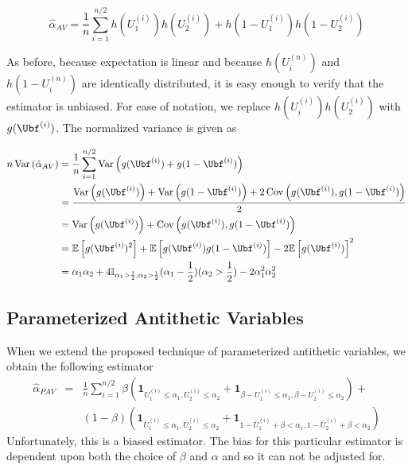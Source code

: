 \documentclass[10pt]{article}
\DeclareMathOperator{\var}{Var}
\DeclareMathOperator{\cov}{Cov}
\begin{document}
\begin{equation}
\hat{\alpha}_{AV} = \frac{1}{n}\displaystyle\sum_{i=1}^{n/2}h(U_{1}^{(i)})h(U_{2}^{(i)})+h(1 - U_{1}^{(i)})h(1 - U_{2}^{(i)})
\end{equation}

As before, because expectation is linear and because $h(U_{i}^{(n)})$ and $h(1-U_{i}^{(n)})$ are identically distributed, it is easy enough to verify that the estimator is unbiased. For ease of notation, we replace $h(U_{i}^{(i)})h(U_{2}^{(i)})$ with $g(\Ubf^{(i)})$. The normalized variance is given as

\begin{align*}
n\var\left(\hat{\alpha}_{AV}\right) &= \frac{1}{n}\sum_{i=1}^{n/2}\var\left(g(\Ubf^{(i)}) + g(1-\Ubf^{(i)})\right)\\
&=\frac{\var\left(g(\Ubf^{(i)})\right) + \var\left(g(1-\Ubf^{(i)})\right) + 2\cov\left(g(\Ubf^{(i)}),g(1-\Ubf^{(i)})\right)}{2}\\
&=\var\left(g(\Ubf^{(i)})\right) + \cov\left(g(\Ubf^{(i)}),g(1-\Ubf^{(i)})\right)\\
&=\mathbb{E}\left[g(\Ubf^{(i)})^2\right] + \mathbb{E}\left[g(\Ubf^{(i)})g(1-\Ubf^{(i)})\right] - 2\mathbb{E}\left[g(\Ubf^{(i)})\right]^{2}\\
&=\alpha_1\alpha_2+ 4\mathbb{I}_{\alpha_1 > \frac{1}{2},\alpha_2 > \frac{1}{2}}(\alpha_1-\frac{1}{2})(\alpha_2 > \frac{1}{2})-2\alpha_1^{2}\alpha_2^2
\end{align*}

\subsection{Parameterized Antithetic Variables}
When we extend the proposed technique of parameterized antithetic variables, we obtain the following estimator
\begin{align}
\hat{\alpha}_{PAV} & = & \frac{1}{n} \sum_{i=1}^{n/2} \beta \left( \mathbf{1}_{U_{1}^{(i)} \leq \alpha_1,U_{2}^{(i)} \leq \alpha_2} + \mathbf{1}_{\beta-U_{1}^{(i)} \leq \alpha_1,\beta-U_{2}^{(i)} \leq \alpha_2} \right) +\\
&  & (1-\beta) \left( \mathbf{1}_{\bar{U}_{1}^{(i)} \leq \alpha_1,\bar{U}_{2}^{(i)} \leq \alpha_2} + \mathbf{1}_{1-\bar{U}_{1}^{(i)} + \beta < \alpha_1,1-\bar{U}_{2}^{(i)} + \beta < \alpha_2} \right)
\end{align}
Unfortunately, this is a biased estimator. The bias for this particular estimator is dependent upon both the choice of $\beta$ and $\alpha$ and so it can not be adjusted for.

\nocite{*}


\end{document}

